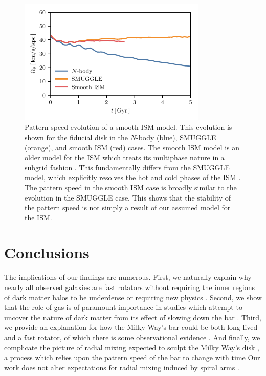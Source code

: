 \documentclass[fleqn,usenatbib]{mnras}
\newcommand{\Nbody}{$N$-body}
\begin{document}
\begin{figure}
    \centering
    \includegraphics[width=9cm]{fig/ps_GFM.pdf}
    \caption{Pattern speed evolution of a smooth ISM model. This evolution is
    shown for the fiducial disk in the \Nbody{} (blue), SMUGGLE (orange), and
    smooth ISM (red) cases. The smooth ISM model is an older model for the ISM
    which treats its multiphase nature in a subgrid fashion
    \citep{2003MNRAS.339..289S}. This fundamentally differs from the SMUGGLE
    model, which explicitly resolves the hot and cold phases of the ISM
    \citep{2019MNRAS.489.4233M}. The pattern speed in the smooth ISM case is
    broadly similar to the evolution in the SMUGGLE case. This shows that the
    stability of the pattern speed is not simply a result of our assumed model
    for the ISM.}
\label{fig:GFM}
\end{figure}

\section{Conclusions}
\label{sec:conclusions}
The implications of our findings are numerous. First, we naturally explain why
nearly all observed galaxies are fast rotators without requiring the inner
regions of dark matter halos to be underdense \citep{1998ApJ...493L...5D,
2000ApJ...543..704D} or requiring new physics \citep{2021MNRAS.503.2833R,
2021MNRAS.508..926R}. Second, we show that the role of gas is of paramount
importance in studies which attempt to uncover the nature of dark matter from
its effect of slowing down the bar \citep{2021MNRAS.500.4710C,
2021MNRAS.505.2412C}. Third, we provide an explanation for how the Milky Way's
bar could be both long-lived and a fast rotator, of which there is some
observational evidence \citep{2019MNRAS.490.4740B}. And finally, we complicate
the picture of radial mixing expected to sculpt the Milky Way's disk
\citep{2012MNRAS.420..913B, 2015ApJ...808..132H}, a process which relies upon
the pattern speed of the bar to change with time Our work does not alter
expectations for radial mixing induced by spiral arms
\citep{2002MNRAS.336..785S}.
\end{document}
